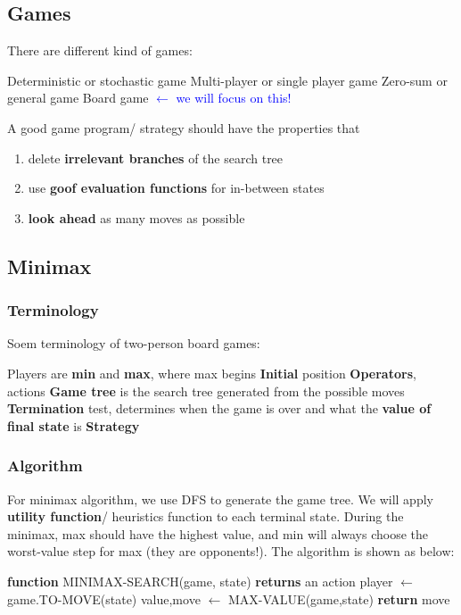 \subsection{Games}
There are different kind of games: 
\begin{outline}
    \1 Deterministic or stochastic game
    \1 Multi-player or single player game
    \1 Zero-sum or general game
    \1 Board game \textcolor{blue}{$\leftarrow$ we will focus on this!}
\end{outline}

\noindent
A good game program/ strategy should have the properties that
\begin{enumerate}
    \item delete \textbf{irrelevant branches} of the search tree
    \item use \textbf{goof evaluation functions} for in-between states
    \item \textbf{look ahead} as many moves as possible
\end{enumerate}

\subsection{Minimax}
\subsubsection{Terminology}
Soem terminology of two-person board games:
\begin{outline}
    \1 Players are \textbf{min} and \textbf{max}, where max begins
    \1 \textbf{Initial} position
    \1 \textbf{Operators}, actions
    \1 \textbf{Game tree} is the search tree generated from the possible moves
    \1 \textbf{Termination} test, determines when the game is over and what the \textbf{value of final state} is
    \1 \textbf{Strategy}
\end{outline}

\subsubsection{Algorithm}
\noindent
For minimax algorithm, we use DFS to generate the game tree. We will apply \textbf{utility function}/ heuristics function to each terminal state. During the minimax, max should have the highest value, and min will always choose the worst-value step for max (they are opponents!). The algorithm is shown as below: 

\tabto{0mm} \textbf{function} MINIMAX-SEARCH(game, state) \textbf{returns} an action
\tabto{5mm} player $\leftarrow$ game.TO-MOVE(state)
\tabto{5mm} value,move $\leftarrow$ MAX-VALUE(game,state)
\tabto{5mm} \textbf{return} move

